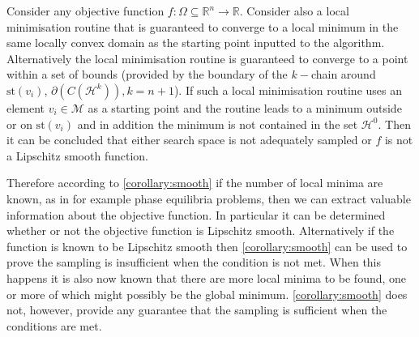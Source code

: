 \begin{corollary} \label{corollary:smooth}
Consider any objective function $f : \Omega \subseteq \mathbb{R}^n \rightarrow \mathbb{R}$. Consider also a local minimisation routine that is guaranteed to converge to a local minimum in the same locally convex domain as the starting point inputted to the algorithm. Alternatively the local minimisation routine is guaranteed to converge to a point within a set of bounds (provided by the boundary of the $k-$chain around $\textrm{st}\left( v_i \right)$,  $\partial \left( C(\mathcal{H}^k) \right), k = n + 1$). If such a local minimisation routine  uses an element $v_i \in \mathcal{M}$ as a starting point and the routine leads to a minimum outside or on $\textrm{st}\left(v_{i}\right)$ and in addition the minimum is not contained in the set $\mathcal{H}^0$. Then it can be concluded that either search space is not adequately sampled or $f$ is not a Lipschitz smooth function.
\end{corollary}
Therefore according to \autoref{corollary:smooth} if the number of local minima are known, as in for example phase equilibria problems, then we can extract valuable information about the objective function. In particular it can be determined whether or not the objective function is Lipschitz smooth. Alternatively if the function is known to be Lipschitz smooth then \autoref{corollary:smooth} can be used to prove the sampling is insufficient when the condition is not met. When this happens it is also now known that there are more local minima to be found, one or more of which might possibly be the global minimum. \autoref{corollary:smooth} does not, however, provide any guarantee that the sampling is sufficient when the conditions are met.
